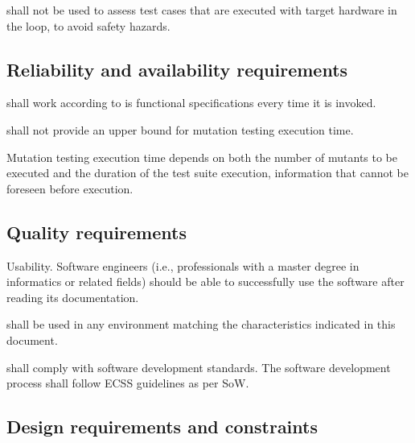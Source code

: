 \RQ{} \FAQAS shall not be used to assess test cases that are executed with target hardware in the loop, to avoid safety hazards.



\subsection{Reliability and availability requirements}

\RQ{} \FAQAS shall work according to is functional specifications every time it is invoked.


\RQ{} \FAQAS shall not provide an upper bound for mutation testing execution time.

\remark Mutation testing execution time depends on both the number of mutants to be executed and the duration of the test suite execution, information that cannot be foreseen before execution.


\subsection{Quality requirements}

\RQ{} Usability. Software engineers (i.e., professionals with a master degree in informatics or related fields) should be able to successfully use the software after reading its documentation.

\RQ{} \FAQAS shall be used in any environment matching the characteristics indicated in this document.

\RQ{} \FAQAS shall comply with software development standards. The software development process shall follow ECSS guidelines as per SoW.

\subsection{Design requirements and constraints}

